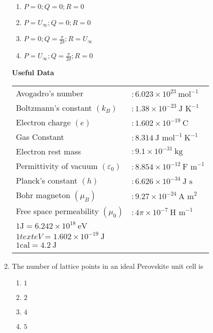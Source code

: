 \documentclass[journal,12pt,onecolumn]{IEEEtran}
\theoremstyle{remark}
\begin{document}
\begin{enumerate}
\begin{enumerate}
	\item $P=0; Q=0; R=0$
	\item $P=U_{\infty}; Q=0; R=0$
	\item $P=0; Q=\frac{\pi}{2\delta}; R=U_{\infty}$
	\item $P=U_{\infty}; Q=\frac{\pi}{2\delta}; R=0$\\
\end{enumerate}

\begin{center}
    \textbf{Useful Data}
\end{center}

\begin{tabular}{@{}l l@{}}
    Avogadro's number & \( : 6.023 \times 10^{23} \ \text{mol}^{-1}\) \\
    Boltzmann's constant \((k_B)\) & \( : 1.38 \times 10^{-23} \ \text{J K}^{-1}\) \\
    Electron charge \((e)\) & \( : 1.602 \times 10^{-19} \ \text{C}\) \\
    Gas Constant & \( : 8.314 \ \text{J mol}^{-1} \ \text{K}^{-1}\) \\
    Electron rest mass & \( : 9.1 \times 10^{-31} \ \text{kg}\) \\
    Permittivity of vacuum \((\varepsilon_0)\) & \( : 8.854 \times 10^{-12} \ \text{F m}^{-1}\) \\
    Planck's constant \((h)\) & \( : 6.626 \times 10^{-34} \ \text{J s}\) \\
    Bohr magneton \((\mu_B)\) & \( : 9.27 \times 10^{-24} \ \text{A m}^2\) \\
    Free space permeability \((\mu_0)\) & \( : 4 \pi \times 10^{-7} \ \text{H m}^{-1}\) \\
    \( 1 \text{J} = 6.242 \times 10^{18} \ \text{eV}\) \\
    \(1 text{eV} = 1.602 \times 10^{-19} \ \text{J}\) \\
    \(1 \text{cal} = 4.2 \ \text{J}\) \\\\
\end{tabular}

\item The number of lattice points in an ideal Perovskite unit cell is

\begin{enumerate}
	\item $1$
	\item $2$
	\item $4$
	\item $5$
\end{enumerate}


\end{enumerate}
\end{document}
